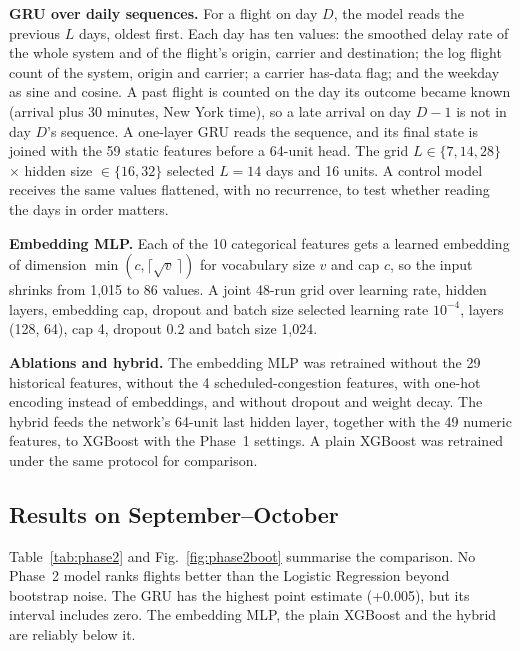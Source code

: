 \textbf{GRU over daily sequences.} For a flight on day $D$, the model reads the previous $L$ days,
oldest first. Each day has ten values: the smoothed delay rate of the whole system and of the
flight's origin, carrier and destination; the log flight count of the system, origin and carrier;
a carrier has-data flag; and the weekday as sine and cosine. A past flight is counted on the day
its outcome became known (arrival plus 30 minutes, New York time), so a late arrival on day $D{-}1$
is not in day $D$'s sequence. A one-layer GRU reads the sequence, and its final state is joined
with the 59 static features before a 64-unit head. The grid $L \in \{7, 14, 28\}$ $\times$ hidden
size $\in \{16, 32\}$ selected $L = 14$ days and 16 units. A control model receives the same values
flattened, with no recurrence, to test whether reading the days in order matters.

\textbf{Embedding MLP.} Each of the 10 categorical features gets a learned embedding of dimension
$\min(c, \lceil\sqrt{v}\,\rceil)$ for vocabulary size $v$ and cap $c$, so the input shrinks from
1{,}015 to 86 values. A joint 48-run grid over learning rate, hidden layers, embedding cap, dropout
and batch size selected learning rate $10^{-4}$, layers (128, 64), cap 4, dropout 0.2 and batch
size 1{,}024.

\textbf{Ablations and hybrid.} The embedding MLP was retrained without the 29 historical features,
without the 4 scheduled-congestion features, with one-hot encoding instead of embeddings, and
without dropout and weight decay. The hybrid feeds the network's 64-unit last hidden layer, together
with the 49 numeric features, to XGBoost with the Phase~1 settings. A plain XGBoost was retrained
under the same protocol for comparison.

\subsection{Results on September--October}
Table~\ref{tab:phase2} and Fig.~\ref{fig:phase2boot} summarise the comparison. No Phase~2 model
ranks flights better than the Logistic Regression beyond bootstrap noise. The GRU has the highest
point estimate (+0.005), but its interval includes zero. The embedding MLP, the plain XGBoost and the
hybrid are reliably below it.

